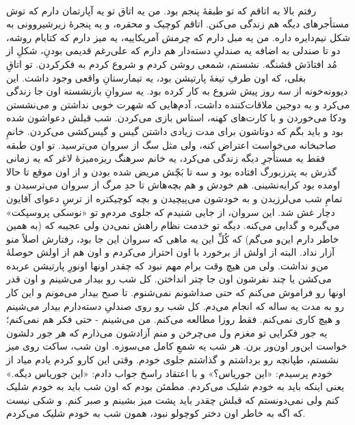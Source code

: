 \documentclass[12pt]{book}
\begin{document}
    \paragraph{}
    رفتم بالا به اتاقم که تو طبقهٔ پنجم بود. من یه اتاق تو یه آپارتمان دارم که توش مستأجرهای دیگه هم زندگی می‌کنن. اتاقم کوچیک و محقره، و یه پنجرهٔ زیرشیروونی به شکل نیم‌دایره داره. من یه مبل دارم که چرمش آمریکاییه، یه میز دارم که کتابام روشه، دو تا صندلی به اضافه یه صندلیِ دسته‌دار هم دارم که علی‌رغم قدیمی بودنِ، شکلِ از مُد افتادَش قشنگه. نشستم، شمعی روشن کردم و شروع کردم به فکرکردن. تو اتاقِ بغلی، که اون طرفِ تیغهٔ پارتیشن بود، یه تیمارستانِ واقعی وجود داشت. این دیوونه‌خونه از سه روز پیش شروع به کار کرده بود. یه سروانِ بازنشسته اون جا زندگی می‌کرد و یه دوجین ملاقات‌کننده داشت، آدم‌هایی که شهرت خوبی نداشتن و می‌نشستن ودکا می‌خوردن و با کارت‌های کهنه، استاس بازی می‌کردن. شب قبلش دعواشون شده بود و باید بگم که دوتاشون برای مدت زیادی داشتن گیس و گیس‌کشی می‌کردن. خانمِ صاحبخانه می‌خواست اعتراض کنه، ولی مثل سگ از سروان می‌ترسید. تو اون طبقه فقط یه مستأجرِ دیگه زندگی می‌کرد، یه خانم سرهنگ ریزه‌میزهٔ لاغر که یه زمانی گذرش به پترزبورگ افتاده بود و سه تا بَچّش مریض شده بودن و از اون موقع تا حالا اومده بود کرایه‌نشینی. هم خودش و هم بچه‌هاش تا حدِ مرگ از سروان می‌ترسیدن و تمامِ شب می‌لرزیدن و به خودشون می‌پیچیدن و بچه کوچیکتره از ترسِ دعوای آقایون دچار غش شد. این سروان، از جایی شنیدم که جلوی مردم‌و تو «نوسکی پروسپکت» می‌گیره و گدایی می‌کنه. دیگه تو خدمت نظام راهش نمی‌دن ولی عجیبه که (به همین خاطر دارم این‌و می‌گم) که کُلِّ این یه ماهی که سروان این جا بود، رفتارش اصلاً منو آزار نداد. البته از اولش از برخورد با اون احتراز می‌کردم و اون هم از اولش حوصلهٔ من‌و نداشت. ولی من هیچ وقت برام مهم نبود که چقدر اونها اونورِ پارتیشن عربده می‌کشن یا چند نفرشون اون جا چتر انداختن. کل شب رو بیدار می‌شینم و اون قدر اونها رو فراموش می‌کنم که حتی صداشونم نمی‌شنوم. تا صبح بیدار می‌مونم و این کار رو به مدت یه ساله که انجام می‌دم. کل شب رو روی صندلیِ دسته‌دارم بیدار می‌شینم و هیچ کاری نمی‌کنم. فقط روزا مطالعه می‌کنم. من می‌شینم - حتی فکر هم نمی‌کنم؛ یه جور فکرایی تو مغزم ول می‌چرخن و منم آزادشون می‌ذارم که هر جور دلشون خواست این‌ور اون‌ور برن. هر شب یه شمعِ کامل می‌سوزه. اون شب، ساکت روی میز نشستم، طپانچه رو برداشتم و گذاشتم جلوی خودم. وقتی این کارو کردم یادم میاد از خودم پرسیدم: «این جوریاس؟» و با اعتقاد راسخ جواب دادم: «این جوریاس دیگه.» یعنی اینکه باید به خودم شلیک می‌کردم. مطمئن بودم که اون شب باید به خودم شلیک کنم ولی نمی‌دونستم که قبلش چقدر باید پشت میز بشینم و صبر کنم. و شکی نیست که اگه به خاطر اون دختر کوچولو نبود، همون شب به خودم شلیک می‌کردم.
\end{document}

